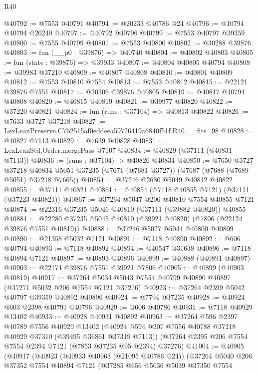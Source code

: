 \begin{lexlean}{R40}
\begin{coremodule}
@40792 := @7553 @40791
@40794 := @20233 @40786 @24
@40796 := @10794 @40794 @20240
@40797 := @40792 @40796
@40799 := @7553 @40797 @39359
@40800 := @7555 @40799
@40801 := @7553 @40800
@40802 := @30288 @39876
@40803 := fun (__p0 : @39876) => @40740
@40804 := @40802 @40803
@40805 := fun (state : @39876) => @39933
@40807 := @40804 @40805 @40794
@40808 := @39983 @37210
@40809 := @40807 @40808
@40810 := @40801 @40809
@40812 := @7553 @40810 @7554
@40813 := @7553 @40812
@40815 := @22121 @39876 @7551
@40817 := @30306 @39876 @40805
@40819 := @40817 @40794 @40808
@40820 := @40815 @40819
@40821 := @39977 @40820
@40822 := @37220 @40821
@40824 := fun (runs : @37104) => @40813 @40822
@40826 := @7633 @3727 @37218
@40827 := LexLeanPreserve.C7b2515af0eddeea59726419a6840f51f.R40.__fits_98
@40828 := @40827 @7113
@40829 := @7639 @40828
@40831 := LexLeanStd.Order.mergePass @7107
@40834 := @40829 (@37111 (@40831 @7113))
@40836 := (runs : @37104) -> @40826 @40834
@40850 := @7650
    @3727
    @37218
    @40834
    @5051
    @37235
    (@7671 (@7681 @3727))
    (@7687 (@7688 (@7689 @5051) @37218 @7665))
@40854 := @37246 @2680 @5049 @40812 @40822
@40855 := @37111 @40821
@40861 := @40854 (@7118 @40855 @7121) (@37111 (@37223 @40821))
@40867 := @37264 @5047 @206 @40810 @7554 @40855 @7121
@40874 := @22316 @37235 @5046 @40810 (@37111 (@39882 @40820)) @40855
@40884 := @22280 @37235 @5045 @40810 (@39921 @40820) (@7806 (@22124 @39876 @7551 @40819))
@40888 := @37246 @5027 @5044 @40800 @40809
@40890 := @21358 @5032 @7121
@40891 := @7118 @40890
@40892 := @606 @40794
@40893 := @7118 @40892
@40894 := @40547 @31638
@40896 := @7118 @40894 @7121
@40897 := @40893 @40896
@40899 := @40888 (@40891 @40897)
@40903 := @22174 @39876 @7551 @39921 @7806
@40905 := @40899 (@40903 @40819)
@40917 := @37264 @5034 @5043 @7554 @40799 @40890 @40897 (@37271 @5032 @206 @7554 @7121 @37276)
@40923 := @37264 @2399 @5042 @40797 @39359 @40892 @40896
@40924 := @7794 @37235
@40928 := @40924 @603 @2398 @40791 @40796
@40929 := @606 @40786
@40931 := @7118 @40929 @13402
@40933 := @40928 @40931 @40892
@40963 := @37264
    @596
    @2397
    @40789
    @7556
    @40929
    @13402
    (@40924 @594 @207 @7556 @40788 @37218 @40929 @37310 (@39495 @36861 @37319 @7113))
    (@37264 @2395 @206 @7554 @7554 @2394 @7121 (@7853 @37235 @95 @2394) @37276)
@41004 := @40905
    (@40917
      (@40923
        (@40933 @40963 (@21095 @40786 @24))
        (@37264
          @5040
          @206
          @37352
          @7554
          @40894
          @7121
          (@37285
            @656
            @5036
            @5039
            @37350
            @7554

\end{coremodule}
\end{lexlean}
